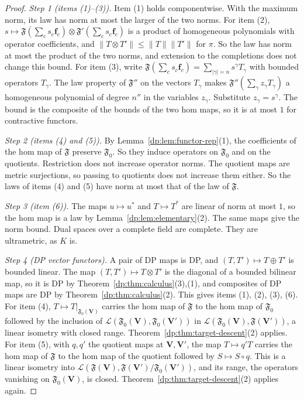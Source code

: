 \documentclass[11pt]{amsart}
\theoremstyle{definition}
\theoremstyle{remark}
\numberwithin{equation}{section}
\newcommand{\cL}{\mathcal L}
\newcommand{\abs}[1]{\lvert #1\rvert}
\newcommand{\norm}[1]{\lVert #1\rVert}
\theoremstyle{plain}
\theoremstyle{definition}
\theoremstyle{plain}
\begin{document}
\begin{proof}
\emph{Step 1 (items (1)--(3)).} Item (1) holds componentwise. With the maximum norm, its law has norm at most the larger of the two norms. For item (2), $s\mapsto\mathfrak F(\sum_cs_c\mathbf f_c)\otimes\mathfrak F'(\sum_cs_c\mathbf f_c)$ is a product of homogeneous polynomials with operator coefficients, and $\norm{T\otimes T'}\le\norm T\norm{T'}$ for $\pi$. So the law has norm at most the product of the two norms, and extension to the completions does not change this bound. For item (3), write $\mathfrak F(\sum_cs_c\mathbf f_c)=\sum_{\abs\gamma=n}s^\gamma T_\gamma$ with bounded operators $T_\gamma$. The law property of $\mathfrak F''$ on the vectors $T_\gamma$ makes $\mathfrak F''(\sum_\gamma z_\gamma T_\gamma)$ a homogeneous polynomial of degree $n''$ in the variables $z_\gamma$. Substitute $z_\gamma=s^\gamma$. The bound is the composite of the bounds of the two hom maps, so it is at most $1$ for contractive functors.

\emph{Step 2 (items (4) and (5)).} By Lemma~\ref{dp:lem:functor-rep}(1), the coefficients of the hom map of $\mathfrak F$ preserve $\mathfrak F_0$. So they induce operators on $\mathfrak F_0$ and on the quotients. Restriction does not increase operator norms. The quotient maps are metric surjections, so passing to quotients does not increase them either. So the laws of items (4) and (5) have norm at most that of the law of $\mathfrak F$.

\emph{Step 3 (item (6)).} The maps $u\mapsto u^*$ and $T\mapsto T^*$ are linear of norm at most $1$, so the hom map is a law by Lemma~\ref{dp:lem:elementary}(2). The same maps give the norm bound. Dual spaces over a complete field are complete. They are ultrametric, as $K$ is.

\emph{Step 4 (DP vector functors).} A pair of DP maps is DP, and $(T,T')\mapsto T\oplus T'$ is bounded linear. The map $(T,T')\mapsto T\otimes T'$ is the diagonal of a bounded bilinear map, so it is DP by Theorem~\ref{dp:thm:calculus}(3),(1), and composites of DP maps are DP by Theorem~\ref{dp:thm:calculus}(2). This gives items (1), (2), (3), (6). For item (4), $T\mapsto T|_{\mathfrak F_0(\mathbf V)}$ carries the hom map of $\mathfrak F$ to the hom map of $\mathfrak F_0$ followed by the inclusion of $\cL(\mathfrak F_0(\mathbf V),\mathfrak F_0(\mathbf V'))$ in $\cL(\mathfrak F_0(\mathbf V),\mathfrak F(\mathbf V'))$, a linear isometry with closed range. Theorem~\ref{dp:thm:target-descent}(2) applies. For item (5), with $q,q'$ the quotient maps at $\mathbf V,\mathbf V'$, the map $T\mapsto q'T$ carries the hom map of $\mathfrak F$ to the hom map of the quotient followed by $S\mapsto S\circ q$. This is a linear isometry into $\cL(\mathfrak F(\mathbf V),\mathfrak F(\mathbf V')/\mathfrak F_0(\mathbf V'))$, and its range, the operators vanishing on $\mathfrak F_0(\mathbf V)$, is closed. Theorem~\ref{dp:thm:target-descent}(2) applies again.
\end{proof}
\end{document}
